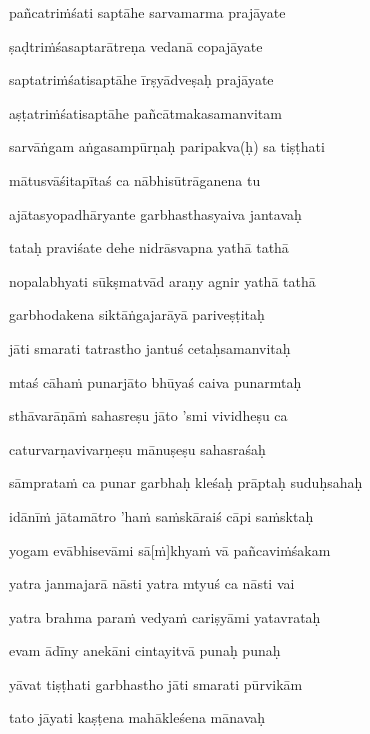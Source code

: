 pañcatri\.mśati saptāhe sarvamarma prajāyate\thinspace{\dandab} \dontdisplaylinenum

ṣaḍtri\.mśasaptarātreṇa vedanā copajāyate \veg\dontdisplaylinenum

saptatri\.mśatisaptāhe īrṣyādveṣaḥ prajāyate\thinspace{\dandab} \dontdisplaylinenum

aṣṭatri\.mśatisaptāhe pañcātmakasamanvitam \veg\dontdisplaylinenum

sarvāṅgam aṅgasampūrṇaḥ paripakva(ḥ) sa tiṣṭhati\thinspace{\dandab} \dontdisplaylinenum

mātusvāśitapītaś ca nābhisūtrāganena tu \veg\dontdisplaylinenum

ajātasyopadhāryante garbhasthasyaiva jantavaḥ\thinspace{\dandab} \dontdisplaylinenum

tataḥ praviśate dehe nidrāsvapna yathā tathā \veg\dontdisplaylinenum

nopalabhyati sūkṣmatvād araṇy agnir yathā tathā\thinspace{\dandab} \dontdisplaylinenum

garbhodakena siktāṅgajarāyā pariveṣṭitaḥ \veg\dontdisplaylinenum

jāti smarati tatrastho jantuś cetaḥsamanvitaḥ\thinspace{\dandab} \dontdisplaylinenum

mtaś cāha\.m punarjāto bhūyaś caiva punarmtaḥ \veg\dontdisplaylinenum

sthāvarāṇā\.m sahasreṣu jāto 'smi vividheṣu ca\thinspace{\dandab} \dontdisplaylinenum

caturvarṇavivarṇeṣu mānuṣeṣu sahasraśaḥ \veg\dontdisplaylinenum

sāmprata\.m ca punar garbhaḥ kleśaḥ prāptaḥ suduḥsahaḥ\thinspace{\dandab} \dontdisplaylinenum

idānī\.m jātamātro 'ha\.m sa\.mskāraiś cāpi sa\.msktaḥ \veg\dontdisplaylinenum

yogam evābhisevāmi sā[\.m]khya\.m vā pañcavi\.mśakam\thinspace{\dandab} \dontdisplaylinenum

yatra janmajarā nāsti yatra mtyuś ca nāsti vai \veg\dontdisplaylinenum

yatra brahma para\.m vedya\.m cariṣyāmi yatavrataḥ\thinspace{\dandab} \dontdisplaylinenum

evam ādīny anekāni cintayitvā punaḥ punaḥ \veg\dontdisplaylinenum

yāvat tiṣṭhati garbhastho jāti smarati pūrvikām\thinspace{\dandab} \dontdisplaylinenum

tato jāyati kaṣṭena mahākleśena mānavaḥ \veg\dontdisplaylinenum

